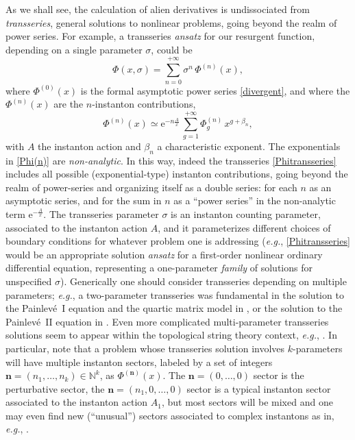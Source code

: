 \documentclass[11pt,a4paper]{article}
\def\BN{{\mathbb N}}
\newcommand{\be}{\begin{equation}}
\newcommand{\ee}{\end{equation}}
\newcommand{\rme}{{\mathrm{e}}}
\begin{document}
As we shall see, the calculation of alien derivatives is undissociated from \textit{transseries}, general solutions to nonlinear problems, going beyond the realm of power series. For example, a transseries \textit{ansatz} for our resurgent function, depending on a single parameter $\sigma$, could be
%
\be
\label{Phitransseries}
\Phi (x,\sigma) = \sum_{n=0}^{+\infty} \sigma^n\, \Phi^{(n)} (x),
\ee
%
\noindent
where $\Phi^{(0)} (x)$ is the formal asymptotic power series \eqref{divergent}, and where the $\Phi^{(n)} (x)$ are the $n$-instanton contributions,
%
\be
\label{Phi(n)}
\Phi^{(n)} (x) \simeq \rme^{-n \frac{A}{x}}\, \sum_{g=1}^{+\infty} \Phi_g^{(n)}\, x^{g + \beta_n},
\ee
%
\noindent
with $A$ the instanton action and $\beta_n$ a characteristic exponent. The exponentials in \eqref{Phi(n)} are \textit{non-analytic}. In this way, indeed the transseries  \eqref{Phitransseries} includes all possible (exponential-type) instanton contributions, going beyond the realm of power-series and organizing itself as a double series: for each $n$ as an asymptotic series, and for the sum in $n$ as a ``power series'' in the non-analytic term $\rme^{-\frac{A}{x}}$. The transseries parameter $\sigma$ is an instanton counting parameter, associated to the instanton action $A$, and it parameterizes different choices of boundary conditions for whatever problem one is addressing (\textit{e.g.}, \eqref{Phitransseries} would be an appropriate solution \textit{ansatz} for a first-order nonlinear ordinary differential equation, representing a one-parameter \textit{family} of solutions for unspecified $\sigma$). Generically one should consider transseries depending on multiple parameters; \textit{e.g.}, a two-parameter transseries was fundamental in the solution to the Painlev\'e~I equation and the quartic matrix model in \cite{gikm10, asv11}, or the solution to the Painlev\'e~II equation in \cite{sv13}. Even more complicated multi-parameter transseries solutions seem to appear within the topological string theory context, \textit{e.g.}, \cite{dmp11, cesv13, cesv14, c15}. In particular, note that a problem whose transseries solution involves $k$-parameters will have multiple instanton sectors, labeled by a set of integers $\boldsymbol{n} = (n_1, \ldots, n_k) \in \BN^k$, as $\Phi^{(\boldsymbol{n})} (x)$. The $\boldsymbol{n} = (0, \ldots, 0)$ sector is the perturbative sector, the $\boldsymbol{n} = (n_1, 0, \ldots, 0)$ sector is a typical instanton sector associated to the instanton action $A_1$, but most sectors will be mixed and one may even find new (``unusual'') sectors associated to complex instantons as in, \textit{e.g.}, \cite{sr78, bpv78a, bpv78b, v83, gikm10, asv11, sv13, bdu13, gmz14, cesv14, cms16, cms17}.
\end{document}
